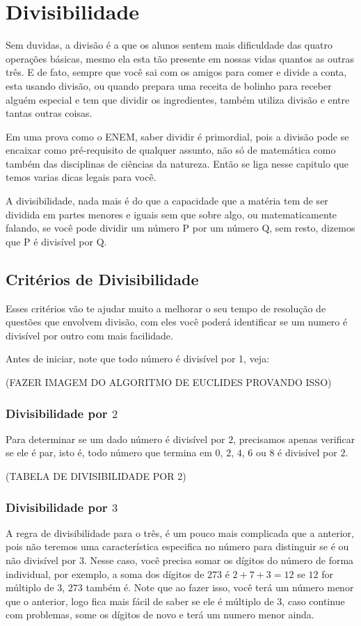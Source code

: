 \chapter{Divisibilidade}
Sem duvidas, a divisão é a que os alunos sentem mais dificuldade das quatro operações básicas, mesmo ela esta tão presente em nossas vidas quantos as outras três. E de fato, sempre que você sai com os amigos para comer e divide a conta, esta usando divisão, ou quando prepara uma receita de bolinho para receber alguém especial e tem que dividir os ingredientes, também utiliza divisão e entre tantas outras coisas.

Em uma prova como o ENEM, saber dividir é primordial, pois a divisão pode se encaixar como pré-requisito de qualquer assunto, não só de matemática como também das disciplinas de ciências da natureza. Então se liga nesse capitulo que temos varias dicas legais para você.

\begin{definition}

 A divisibilidade, nada mais é do que a capacidade que a matéria tem de ser dividida em partes menores e iguais sem que sobre algo, ou matematicamente falando, se você pode dividir um número $\mathrm{P} $  por um número $\mathrm{Q}$, sem resto, dizemos que $\mathrm{P}$ é divisível por $\mathrm{Q}$.
 \end{definition}
\section{Critérios de Divisibilidade}
Esses critérios vão te ajudar muito a melhorar o seu tempo de resolução de questões que envolvem divisão, com eles você poderá identificar se um numero é divisível por outro com mais facilidade.


Antes de iniciar, note que todo número é divisível por 1, veja: 

(FAZER IMAGEM DO ALGORITMO DE EUCLIDES PROVANDO ISSO)
\subsection{Divisibilidade por $2$}
Para determinar se um dado número é divisível por $2$, precisamos apenas verificar se ele 
é par, isto é, todo número que termina em $0$, $2$, $4$, $6$ ou $8$ é divisível por $2$.


(TABELA DE DIVISIBILIDADE POR 2)

\subsection{Divisibilidade por $3$}
A regra de divisibilidade para o três, é um pouco mais complicada que a anterior, pois não teremos uma característica especifica no número para distinguir se é ou não divisível por $3$. Nesse caso, você precisa somar os dígitos do número de forma individual, por exemplo, a soma dos dígitos de $273$ é $2 + 7 + 3 = 12$ se $12$ for múltiplo de $3$, $273$ também é. Note que ao fazer isso, você terá um número menor que o anterior, logo fica mais fácil de saber se ele é múltiplo de $3$, caso continue com problemas, some os dígitos de novo e terá um numero menor ainda. 

